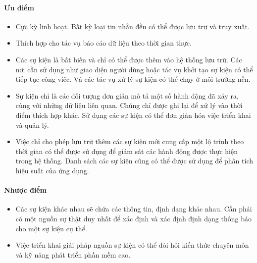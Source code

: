 \paragraph{Ưu điểm}

\begin{itemize}
    \item Cực kỳ linh hoạt. Bất kỳ loại tin nhắn đều có thể được lưu trữ và truy xuất.
    \item Thích hợp cho tác vụ báo cáo dữ liệu theo thời gian thực.
    \item Các sự kiện là bất biến và chỉ có thể được thêm vào hệ thống lưu trữ. Các nơi cần sử dụng như giao diện người dùng hoặc tác vụ khởi tạo sự kiện có thể tiếp tục công viêc. Và các tác vụ xử lý sự kiện có thể chạy ở môi trường nền.
    \item Sự kiện chỉ là các đối tượng đơn giản mô tả một số hành động đã xảy ra, cùng với những dữ liệu liên quan. Chúng chỉ được ghi lại để xử lý vào thời điểm thích hợp khác. Sử dụng các sự kiện có thể đơn giản hóa việc triển khai và quản lý.
    \item Việc chỉ cho phép lưu trữ thêm các sự kiện mới cung cấp một lộ trình theo thời gian có thể được sử dụng để giám sát các hành động được thực hiện trong hệ thống. Danh sách các sự kiện cũng có thể được sử dụng để phân tích hiệu suất của ứng dụng.
\end{itemize}

\paragraph{Nhược điểm}

\begin{itemize}
    \item Các sự kiện khác nhau sẽ chứa các thông tin, định dạng khác nhau. Cần phải có một nguồn sự thật duy nhất để xác định và xác định định dạng thông báo cho một sự kiện cụ thể.
    \item Việc triển khai giải pháp nguồn sự kiện có thể đòi hỏi kiến thức chuyên môn và kỹ năng phát triển phần mềm cao.
\end{itemize}
